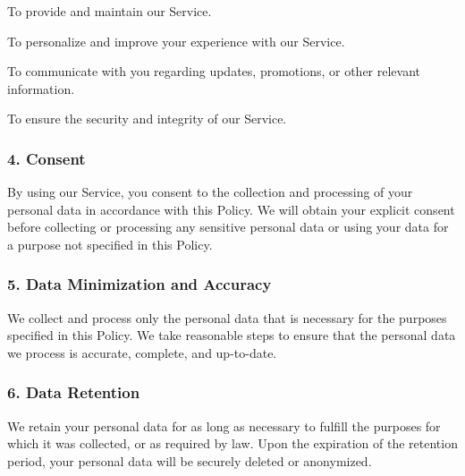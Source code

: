 \documentclass[a4paper]{article}
\begin{document}
\begin{tcolorbox}[colback=gray!20, sharp corners, boxrule=0pt, boxsep=0pt, left=5pt, right=5pt, top=5pt, bottom=5pt]
To provide and maintain our Service.

To personalize and improve your experience with our Service.

To communicate with you regarding updates, promotions, or other relevant information.

To ensure the security and integrity of our Service.
\subsubsection*{4. Consent}
By using our Service, you consent to the collection and processing of your personal data in accordance with this Policy. We will obtain your explicit consent before collecting or processing any sensitive personal data or using your data for a purpose not specified in this Policy.

\subsubsection*{5. Data Minimization and Accuracy}
We collect and process only the personal data that is necessary for the purposes specified in this Policy. We take reasonable steps to ensure that the personal data we process is accurate, complete, and up-to-date.

\subsubsection*{6. Data Retention}
We retain your personal data for as long as necessary to fulfill the purposes for which it was collected, or as required by law. Upon the expiration of the retention period, your personal data will be securely deleted or anonymized.
\end{tcolorbox}

\newpage
\end{document}
